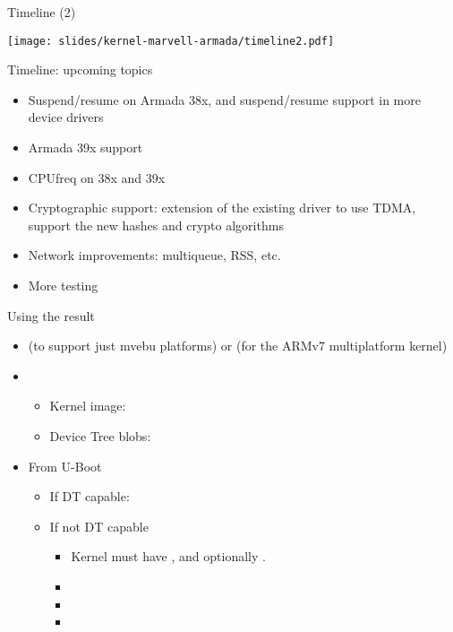 \begin{frame}{Timeline (2)}
  \begin{center}
    \texttt{[image: slides/kernel-marvell-armada/timeline2.pdf]}
  \end{center}
\end{frame}

\begin{frame}{Timeline: upcoming topics}
  \begin{itemize}
  \item Suspend/resume on Armada 38x, and suspend/resume support in
    more device drivers
  \item Armada 39x support
  \item CPUfreq on 38x and 39x
  \item Cryptographic support: extension of the existing
     driver to use TDMA, support the new hashes and
    crypto algorithms
  \item Network improvements: multiqueue, RSS, etc.
  \item More testing
  \end{itemize}
\end{frame}

\begin{frame}{Using the result}

\begin{itemize}
\item {} (to support just mvebu platforms) or
   (for the ARMv7 multiplatform kernel)
\item {}
  \begin{itemize}
  \item Kernel image: 
  \item Device Tree blobs: 
  \end{itemize}
\item From U-Boot
  \begin{itemize}
  \item If DT capable: 
  \item If not DT capable
    \begin{itemize}
    \item Kernel must have , and
      optionally .
    \item {}
    \item {}
    \item {}
    \end{itemize}
  \end{itemize}
\end{itemize}

\end{frame}

